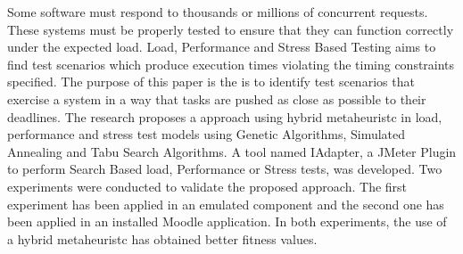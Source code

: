Some software must respond to  thousands or millions of concurrent requests. 
These systems must be properly tested to ensure that they can function correctly under the expected load.  
Load, Performance and Stress Based Testing aims to find test scenarios which produce execution times violating the timing constraints specified. 
The purpose of this paper is the is to identify  test scenarios that exercise a system in a way that tasks are pushed as close as possible to their deadlines. The research proposes  a approach using hybrid metaheuristc in load, performance and stress test models using Genetic Algorithms, Simulated Annealing and Tabu Search Algorithms. A tool named IAdapter, a JMeter Plugin to perform Search Based load, Performance or Stress tests, was developed. Two experiments were conducted to validate the proposed approach. The first experiment has been applied in an emulated component and the second one has been applied in an installed Moodle application. In both experiments, the use of a hybrid metaheuristc has obtained better fitness values.
%
% 
%

%
%
